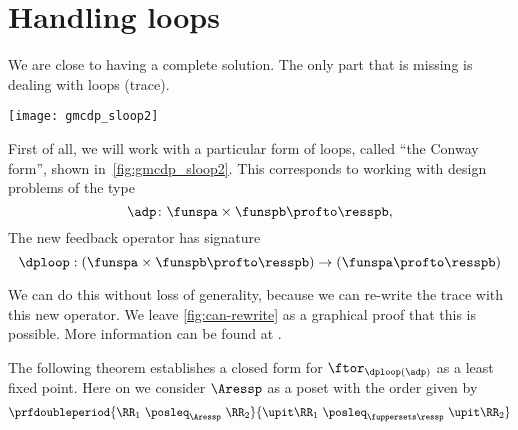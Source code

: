 
\section{Handling loops}

We are close to having a complete solution. The only part that is missing is dealing with loops (trace).

\begin{marginfigure}
    \texttt{[image: gmcdp\_sloop2]}
    \caption{}
    \label{fig:gmcdp_sloop2}
\end{marginfigure}

First of all, we will work with a particular form of loops, called ``the Conway form'',
shown in~\cref{fig:gmcdp_sloop2}. This corresponds to working with design problems of the type
\begin{equation}
    \adp \colon \funspa \times \funspb  \profto \resspb,
\end{equation}
The new feedback operator has signature 
\begin{equation}
    \dploop: (\funspa \times \funspb \profto \resspb) \to (\funspa \profto \resspb)
\end{equation}


We can do this without loss of generality, because we can re-write the trace 
with this new operator. 
We leave \cref{fig:can-rewrite} as a graphical proof that this is possible.
More information can be found at \XXX.

\begin{figure*}[h]
    \hspace*{\fill}
    \hspace*{\fill}
    \hspace*{\fill}
    \caption{We can rewrite the trace in Conway's form.}
    \label{fig:can-rewrite}
\end{figure*}


The following theorem establishes a closed form for $\ftor_{\dploop(\adp)}$
as a least fixed point. 
Here on we consider $\Aressp$ as a poset with the order given by 
\begin{equation}  
    \prfdoubleperiod{
        \RR_1 \  \posleq_{\Aressp} \ \RR_2
        }{
            \upit \RR_1 \ \posleq_{\fuppersets \ressp}\  \upit \RR_2
        }
\end{equation}

